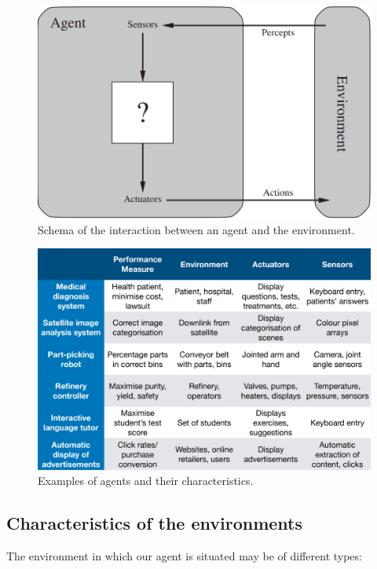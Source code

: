 \begin{figure}[hbt]
    \centering
    \includegraphics[scale=0.35]{Images/Chapter 1/agent-environment-schema.png}
    \caption{Schema of the interaction between an agent and the environment.}
    \label{fig:ch1-agentenvironmentschema}
\end{figure}
\begin{figure}[hbtp]
    \centering
    \includegraphics[width=\textwidth]{Images/Chapter 1/agents-type.png}
    \caption{Examples of agents and their characteristics.}
    \label{fig:ch1-agentexamples}
\end{figure}

\subsection{Characteristics of the environments}
The environment in which our agent is situated may be of different types:

